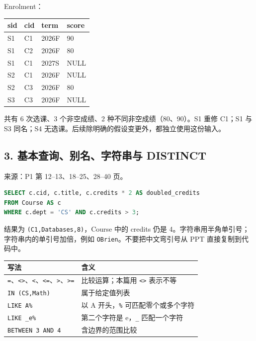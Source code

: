 Enrolment：

\begin{longtable}[]{@{}llll@{}}
\toprule\noalign{}
sid & cid & term & score \\
\midrule\noalign{}
\endhead
\bottomrule\noalign{}
\endlastfoot
S1 & C1 & 2026F & 90 \\
S1 & C2 & 2026F & 80 \\
S1 & C1 & 2027S & NULL \\
S2 & C1 & 2026F & NULL \\
S2 & C3 & 2026F & 80 \\
S3 & C3 & 2026F & NULL \\
\end{longtable}

共有 6 次选课、3 个非空成绩、2 种不同非空成绩（80、90）。S1 重修 C1；S1 与 S3 同名；S4 无选课。后续除明确的假设变更外，都独立使用这份输入。

\subsection{3. 基本查询、别名、字符串与 DISTINCT}\label{06_sql_queries_zh-ux57faux672cux67e5ux8be2ux522bux540dux5b57ux7b26ux4e32ux4e0e-distinct}

来源：P1 第 12--13、18--25、28--40 页。

\Needspace{75pt}
\begin{lstlisting}[language=SQL]
SELECT c.cid, c.title, c.credits * 2 AS doubled_credits
FROM Course AS c
WHERE c.dept = 'CS' AND c.credits > 3;
\end{lstlisting}

结果为 \texttt{(\allowbreak{}C1,\allowbreak{}Databases,\allowbreak{}8)\allowbreak{}}，Course 中的 credits 仍是 4。字符串用半角单引号；字符串内的单引号加倍，例如 \texttt{\textquotesingle{}O\textquotesingle{}\textquotesingle{}Brien\textquotesingle{}}。不要把中文弯引号从 PPT 直接复制到代码中。

\begin{longtable}[]{@{}ll@{}}
\toprule\noalign{}
写法 & 含义 \\
\midrule\noalign{}
\endhead
\bottomrule\noalign{}
\endlastfoot
\texttt{=}、\texttt{\textless{}\textgreater{}}、\texttt{\textless{}}、\texttt{\textless{}=}、\texttt{\textgreater{}}、\texttt{\textgreater{}=} & 比较运算；本篇用 \texttt{\textless{}\textgreater{}} 表示不等 \\
\texttt{IN\ (\textquotesingle{}CS\textquotesingle{},\textquotesingle{}Math\textquotesingle{})} & 属于给定值列表 \\
\texttt{LIKE\ \textquotesingle{}A\%\textquotesingle{}} & 以 A 开头，\texttt{\%} 可匹配零个或多个字符 \\
\texttt{LIKE\ \textquotesingle{}\_e\%\textquotesingle{}} & 第二个字符是 e，\texttt{\_} 匹配一个字符 \\
\texttt{BETWEEN\ 3\ AND\ 4} & 含边界的范围比较 \\
\end{longtable}

